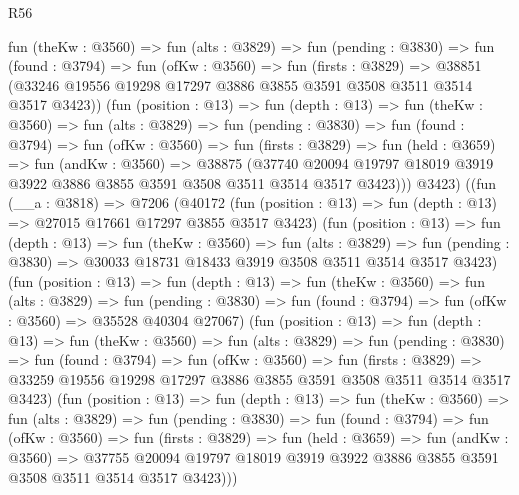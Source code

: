 \begin{lexlean}{R56}
\begin{coremodule}
          fun (theKw : @3560) =>
          fun (alts : @3829) =>
          fun (pending : @3830) =>
          fun (found : @3794) =>
          fun (ofKw : @3560) =>
          fun (firsts : @3829) =>
          @38851 (@33246 @19556 @19298 @17297 @3886 @3855 @3591 @3508 @3511 @3514 @3517 @3423))
          (fun (position : @13) =>
          fun (depth : @13) =>
          fun (theKw : @3560) =>
          fun (alts : @3829) =>
          fun (pending : @3830) =>
          fun (found : @3794) =>
          fun (ofKw : @3560) =>
          fun (firsts : @3829) =>
          fun (held : @3659) =>
          fun (andKw : @3560) =>
          @38875
            (@37740
              @20094
              @19797
              @18019
              @3919
              @3922
              @3886
              @3855
              @3591
              @3508
              @3511
              @3514
              @3517
              @3423)))
          @3423)
        ((fun (__a : @3818) =>
        @7206
          (@40172
            (fun (position : @13) => fun (depth : @13) => @27015 @17661 @17297 @3855 @3517 @3423)
            (fun (position : @13) =>
            fun (depth : @13) =>
            fun (theKw : @3560) =>
            fun (alts : @3829) =>
            fun (pending : @3830) => @30033 @18731 @18433 @3919 @3508 @3511 @3514 @3517 @3423)
            (fun (position : @13) =>
            fun (depth : @13) =>
            fun (theKw : @3560) =>
            fun (alts : @3829) =>
            fun (pending : @3830) =>
            fun (found : @3794) => fun (ofKw : @3560) => @35528 @40304 @27067)
            (fun (position : @13) =>
            fun (depth : @13) =>
            fun (theKw : @3560) =>
            fun (alts : @3829) =>
            fun (pending : @3830) =>
            fun (found : @3794) =>
            fun (ofKw : @3560) =>
            fun (firsts : @3829) =>
            @33259 @19556 @19298 @17297 @3886 @3855 @3591 @3508 @3511 @3514 @3517 @3423)
            (fun (position : @13) =>
            fun (depth : @13) =>
            fun (theKw : @3560) =>
            fun (alts : @3829) =>
            fun (pending : @3830) =>
            fun (found : @3794) =>
            fun (ofKw : @3560) =>
            fun (firsts : @3829) =>
            fun (held : @3659) =>
            fun (andKw : @3560) =>
            @37755
              @20094
              @19797
              @18019
              @3919
              @3922
              @3886
              @3855
              @3591
              @3508
              @3511
              @3514
              @3517
              @3423)))

\end{coremodule}
\end{lexlean}

